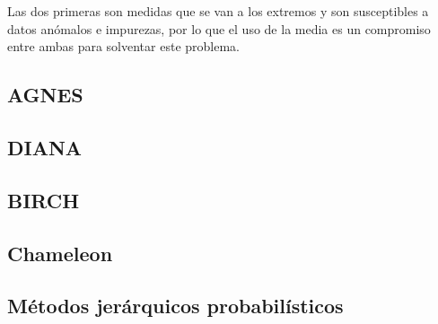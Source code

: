 \documentclass[3p,twocolumn]{elsarticle}
\begin{document}
Las dos primeras son medidas que se van a los extremos y son susceptibles a datos anómalos e impurezas, por lo que el uso de la media es un compromiso entre ambas para solventar este problema.




\subsection{AGNES} \label{subsec:AGNES}




\subsection{DIANA} \label{subsec:DIANA}




\subsection{BIRCH} \label{subsec:BIRCH}




\subsection{Chameleon} \label{subsec:Chameleon}




\subsection{Métodos jerárquicos probabilísticos} \label{subsec:Métodos jerárquicos probabilísticos}


\end{document}
